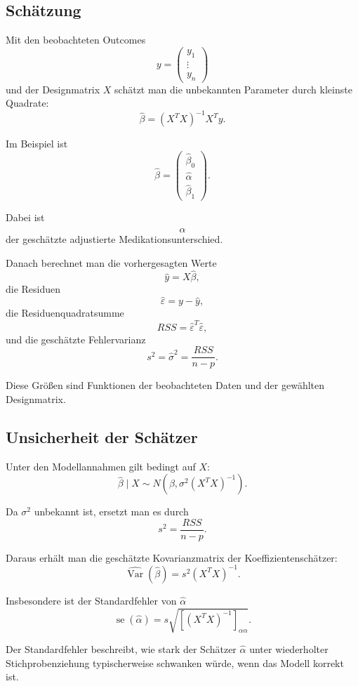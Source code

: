 \documentclass[10pt, letterpaper]{article}
\begin{document}
\subsection{Schätzung}

Mit den beobachteten Outcomes
\[
y=
\begin{pmatrix}
y_1\\
\vdots\\
y_n
\end{pmatrix}
\]
und der Designmatrix \(X\) schätzt man die unbekannten Parameter durch kleinste Quadrate:
\[
\widehat\beta
=
(X^TX)^{-1}X^Ty.
\]

Im Beispiel ist
\[
\widehat\beta=
\begin{pmatrix}
\widehat\beta_0\\
\widehat\alpha\\
\widehat\beta_1
\end{pmatrix}.
\]

Dabei ist
\[
\widehat\alpha
\]
der geschätzte adjustierte Medikationsunterschied.

Danach berechnet man die vorhergesagten Werte
\[
\widehat y=X\widehat\beta,
\]
die Residuen
\[
\widehat\varepsilon=y-\widehat y,
\]
die Residuenquadratsumme
\[
RSS=\widehat\varepsilon^T\widehat\varepsilon,
\]
und die geschätzte Fehlervarianz
\[
s^2=\widehat\sigma^2=\frac{RSS}{n-p}.
\]

Diese Größen sind Funktionen der beobachteten Daten und der gewählten Designmatrix.

\subsection{Unsicherheit der Schätzer}

Unter den Modellannahmen gilt bedingt auf \(X\):
\[
\widehat\beta\mid X
\sim
N\left(\beta,\sigma^2(X^TX)^{-1}\right).
\]

Da \(\sigma^2\) unbekannt ist, ersetzt man es durch
\[
s^2=\frac{RSS}{n-p}.
\]

Daraus erhält man die geschätzte Kovarianzmatrix der Koeffizientenschätzer:
\[
\widehat{\operatorname{Var}}(\widehat\beta)
=
s^2(X^TX)^{-1}.
\]

Insbesondere ist der Standardfehler von \(\widehat\alpha\)
\[
\operatorname{se}(\widehat\alpha)
=
s\sqrt{[(X^TX)^{-1}]_{\alpha\alpha}}.
\]

Der Standardfehler beschreibt, wie stark der Schätzer \(\widehat\alpha\) unter wiederholter Stichprobenziehung typischerweise schwanken würde, wenn das Modell korrekt ist.
\end{document}
